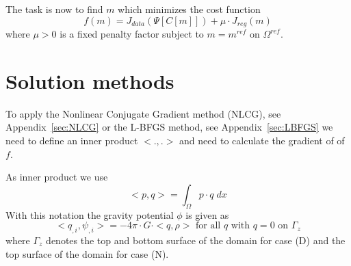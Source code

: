 The task is now to find $m$ which minimizes the cost function
\begin{equation}\label{GRAV:EQU:103}
f(m) =  J_{data}(\Psi[C[m]]) +  \mu \cdot J_{reg}(m)
\end{equation} 
where $\mu>0$ is a fixed penalty factor subject to $m=m^{ref}$ on $\Omega^{ref}$.

\section{Solution methods}
To apply the Nonlinear Conjugate Gradient method (NLCG), see Appendix~\ref{sec:NLCG} or the L-BFGS method, see Appendix~\ref{sec:LBFGS} we need
to define an inner product $<.,.>$ and need to calculate the gradient of of $f$. 

As inner product we use 
\begin{equation}\label{GRAV:EQU:200}
<p,q> = \int_{\Omega} p \cdot q \; dx
\end{equation} 
With this notation the gravity potential $\phi$ is given as
\begin{equation}\label{GRAV:EQU:201}
< q_{,i},\psi_{,i} > = - 4\pi \cdot G \cdot  < q , \rho > \mbox{ for all } q \mbox{ with } q=0 \mbox{ on } \Gamma_{z}
\end{equation} 
where $\Gamma_{z}$ denotes the top and bottom surface of the domain for case (D)
and the top surface of the domain for case (N). 


